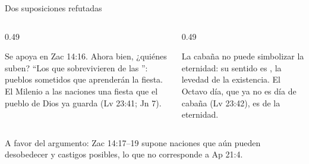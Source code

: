 \begin{frame}{Dos suposiciones refutadas}
\begin{columns}[t,onlytextwidth]
\begin{column}{0.49\textwidth}
\begin{tcolorbox}[colback=papiro,colframe=tierraroja!70,boxrule=0.8pt,arc=2pt,left=4pt,right=4pt,title={\scriptsize 1. ``En el Milenio, no ahora''},fonttitle=\bfseries,coltitle=papiro,colbacktitle=tierraroja!80]
\scriptsize Se apoya en Zac 14:16. Ahora bien, ¿quiénes suben? ``Los que sobrevivieren de las '': pueblos sometidos que aprenderán la fiesta. El Milenio  a las naciones una fiesta que el pueblo de Dios ya guarda (Lv 23:41; Jn 7).
\end{tcolorbox}
\end{column}
\begin{column}{0.49\textwidth}
\begin{tcolorbox}[colback=papiro,colframe=tierraroja!70,boxrule=0.8pt,arc=2pt,left=4pt,right=4pt,title={\scriptsize 2. ``Sukkot simboliza la eternidad''},fonttitle=\bfseries,coltitle=papiro,colbacktitle=tierraroja!80]
\scriptsize La cabaña no puede simbolizar la eternidad: su sentido es , la levedad de la existencia. El Octavo día, que ya no es día de cabaña (Lv 23:42), es  de la eternidad.
\end{tcolorbox}
\end{column}
\end{columns}\par\medskip
\small A favor del argumento: Zac 14:17--19 supone naciones que aún pueden desobedecer y castigos posibles, lo que no corresponde a Ap 21:4.
\end{frame}

